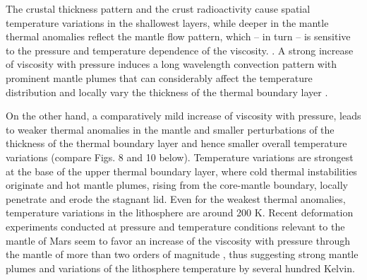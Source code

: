 The crustal thickness pattern and the crust radioactivity cause spatial temperature variations in the shallowest layers, while deeper in the mantle thermal anomalies reflect the mantle flow pattern, which -- in turn -- is sensitive to the pressure and temperature dependence of the viscosity. . A strong increase of viscosity with pressure induces a long wavelength convection pattern with prominent mantle plumes that can considerably affect the temperature distribution and locally vary the thickness of the thermal boundary layer \citep[e.g.,][]{Yoshida2006, Roberts2006, Bunge1996}. 

On the other hand, a comparatively mild increase of viscosity with pressure, leads to weaker thermal anomalies in the mantle and smaller perturbations of the thickness of the thermal boundary layer and hence smaller overall temperature variations (compare Figs. 8 and 10 below). Temperature variations are strongest at the base of the upper thermal boundary layer, where cold thermal instabilities originate and hot mantle plumes, rising from the core-mantle boundary, locally penetrate and erode the stagnant lid. Even for the weakest thermal anomalies, temperature variations in the lithosphere are around 200 K. Recent deformation experiments conducted at pressure and temperature conditions relevant to the mantle of Mars seem to favor an increase of the viscosity with pressure through the mantle of more than two orders of magnitude \citep{Raterron2017}, thus suggesting strong mantle plumes and variations of the lithosphere temperature by several hundred Kelvin.

